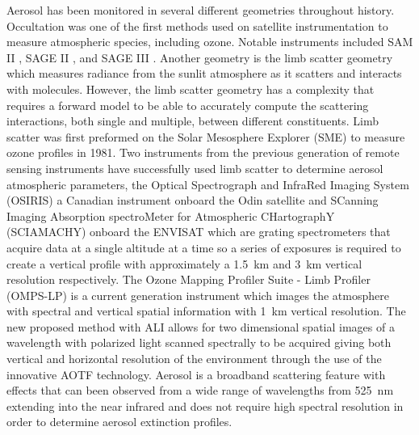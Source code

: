 \documentclass[12pt]{article}
\begin{document}
Aerosol has been monitored in several different geometries throughout history. Occultation was one of the first methods used on satellite instrumentation to measure atmospheric species, including ozone. Notable instruments included SAM II \citep{McCormick1979}, SAGE II \citep{McCormick1987}, and SAGE III \citep{Thomason2003}. Another geometry is the limb scatter geometry which measures radiance from the sunlit atmosphere as it scatters and interacts with molecules. However, the limb scatter geometry has a complexity that requires a forward model to be able to accurately compute the scattering interactions, both single and multiple, between different constituents. Limb scatter was first preformed on the Solar Mesosphere Explorer (SME) \citep{Barth1983} to measure ozone profiles in 1981. Two instruments from the previous generation of remote sensing instruments have successfully used limb scatter to determine aerosol atmospheric parameters, the Optical Spectrograph and InfraRed Imaging System (OSIRIS) a Canadian instrument onboard the Odin satellite \citep{Llewellyn2004} and SCanning Imaging Absorption spectroMeter for Atmospheric CHartographY (SCIAMACHY) onboard the ENVISAT \citep{Bovensmann1999} which are grating spectrometers that acquire data at a single altitude at a time so a series of exposures is required to create a vertical profile with approximately a 1.5~km and 3~km vertical resolution respectively. The Ozone Mapping Profiler Suite - Limb Profiler (OMPS-LP) \citep{Dittman2002} is a current generation instrument which images the atmosphere with spectral and vertical spatial information with 1~km vertical resolution. The new proposed method with ALI allows for two dimensional spatial images of a wavelength with polarized light scanned spectrally to be acquired giving both vertical and horizontal resolution of the environment through the use of the innovative AOTF technology. Aerosol is a broadband scattering feature with effects that can been observed from a wide range of wavelengths from 525~nm extending into the near infrared and does not require high spectral resolution in order to determine aerosol extinction profiles.

\end{document}
